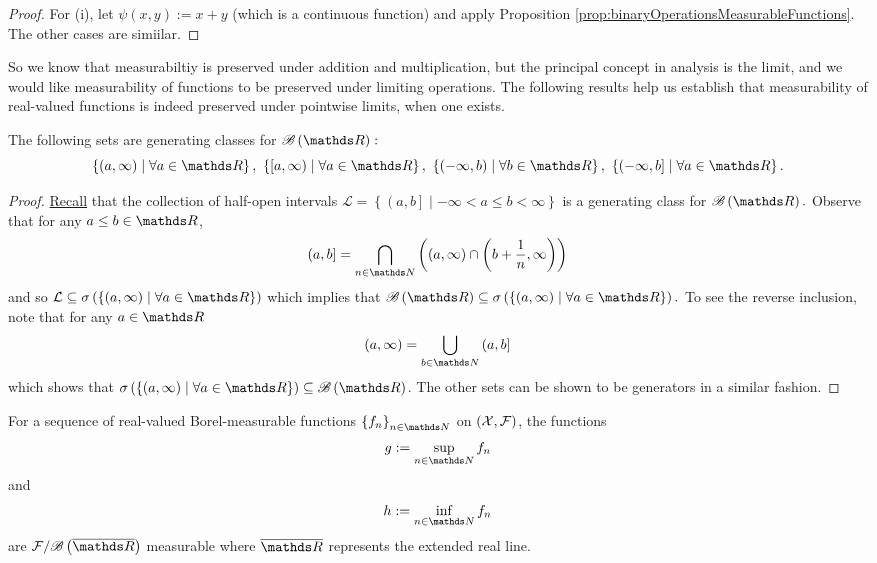 \begin{proof}
For (i), let $\psi\left(x,y\right):=x+y$ (which is a continuous function)
and apply Proposition \ref{prop:binaryOperationsMeasurableFunctions}.
The other cases are simiilar.
\end{proof}
So we know that measurabiltiy is preserved under addition and multiplication,
but the principal concept in analysis is the limit, and we would like
measurability of functions to be preserved under limiting operations.
The following results help us establish that measurability of real-valued
functions is indeed preserved under pointwise limits, when one exists.
\begin{lem}
\label{lem:collectionIntervalsMeasurable}The following sets are generating
classes for $\borel\left(\R\right):$
\[
\left\{ \left(a,\infty\right)\mid\forall a\in\R\right\} ,\ \left\{ \left[a,\infty\right)\mid\forall a\in\R\right\} ,\ \left\{ \left(-\infty,b\right)\mid\forall b\in\R\right\} ,\ \left\{ \left(-\infty,b\right]\mid\forall a\in\R\right\} .
\]
\end{lem}

\begin{proof}
\hyperref[prop:sigmaAlgebraGeneratedbyLisBorel]{Recall} that the
collection of half-open intervals $\mathcal{L}=\left\{ \left(a,b\right]\mid-\infty<a\leq b<\infty\right\} $
is a generating class for $\borel\left(\R\right).$ Observe that for
any $a\leq b\in\R$,
\[
\left(a,b\right]=\bigcap_{n\in\N}\left(\left(a,\infty\right)\cap\left(b+\frac{1}{n},\infty\right)\right)
\]
and so $\mathcal{L}\subseteq\sigma\left(\left\{ \left(a,\infty\right)\mid\forall a\in\R\right\} \right)$
which implies that $\borel\left(\R\right)\subseteq\sigma\left(\left\{ \left(a,\infty\right)\mid\forall a\in\R\right\} \right).$
To see the reverse inclusion, note that for any $a\in\R$
\[
\left(a,\infty\right)=\bigcup_{b\in\N}\left(a,b\right]
\]
which shows that $\sigma\left(\left\{ \left(a,\infty\right)\mid\forall a\in\R\right\} \right)\subseteq\borel\left(\R\right)$.
The other sets can be shown to be generators in a similar fashion.
\end{proof}
\begin{prop}
\label{prop:supInfMeasurable}For a sequence of real-valued Borel-measurable
functions $\left\{ f_{n}\right\} _{n\in\N}$ on $\left(\mathcal{X},\mathcal{F}\right)$,
the functions
\[
g:=\sup_{n\in\N}f_{n}
\]
and 
\[
h:=\inf_{n\in\N}f_{n}
\]
are $\mathcal{F}/\borel\left(\overline{\R}\right)$ measurable where
$\overline{\R}$ represents the extended real line.
\end{prop}

